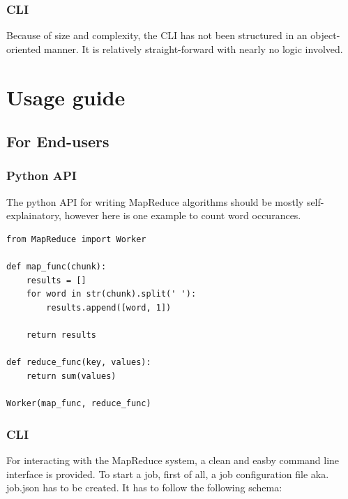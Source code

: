 \documentclass[a4paper]{article}
\begin{document}
\hypertarget{cli}{%
\subsubsection{CLI}\label{cli}}

Because of size and complexity, the CLI has not been structured in an object-oriented manner. It is relatively straight-forward with nearly no logic involved.

\hypertarget{usage-guide}{%
\section{Usage guide}\label{usage-guide}}

\hypertarget{for-end-users}{%
\subsection{For End-users}\label{for-end-users}}

\hypertarget{python-api}{%
\subsubsection{Python API}\label{python-api}}

The python API for writing MapReduce algorithms should be mostly self-explainatory, however here is one example to count word occurances.

\begin{verbatim}
from MapReduce import Worker

def map_func(chunk):
	results = []
	for word in str(chunk).split(' '):
		results.append([word, 1])

	return results

def reduce_func(key, values):
	return sum(values)

Worker(map_func, reduce_func)

\end{verbatim}

\hypertarget{cli-1}{%
\subsubsection{CLI}\label{cli-1}}

For interacting with the MapReduce system, a clean and easby command line interface is provided. To start a job, first of all, a job configuration file aka. job.json has to be created. It has to follow the following schema:
\end{document}
